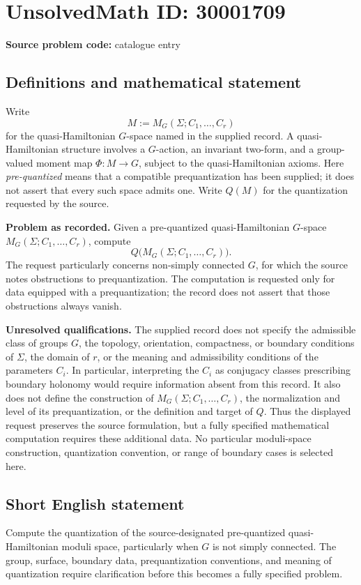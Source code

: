 \documentclass[11pt]{article}
\begin{document}
\section*{UnsolvedMath ID: 30001709}
\textbf{Source problem code:} catalogue entry
\subsection{Definitions and mathematical statement}
Write
\[
M:=M_G(\Sigma;C_1,\ldots,C_r)
\]
for the quasi-Hamiltonian \(G\)-space named in the supplied record. A quasi-Hamiltonian structure involves a \(G\)-action, an invariant two-form, and a group-valued moment map \(\Phi:M\to G\), subject to the quasi-Hamiltonian axioms. Here \emph{pre-quantized} means that a compatible prequantization has been supplied; it does not assert that every such space admits one. Write \(Q(M)\) for the quantization requested by the source.

\textbf{Problem as recorded.} Given a pre-quantized quasi-Hamiltonian \(G\)-space \(M_G(\Sigma;C_1,\ldots,C_r)\), compute
\[
Q\bigl(M_G(\Sigma;C_1,\ldots,C_r)\bigr).
\]
The request particularly concerns non-simply connected \(G\), for which the source notes obstructions to prequantization. The computation is requested only for data equipped with a prequantization; the record does not assert that those obstructions always vanish.

\textbf{Unresolved qualifications.} The supplied record does not specify the admissible class of groups \(G\), the topology, orientation, compactness, or boundary conditions of \(\Sigma\), the domain of \(r\), or the meaning and admissibility conditions of the parameters \(C_i\). In particular, interpreting the \(C_i\) as conjugacy classes prescribing boundary holonomy would require information absent from this record. It also does not define the construction of \(M_G(\Sigma;C_1,\ldots,C_r)\), the normalization and level of its prequantization, or the definition and target of \(Q\). Thus the displayed request preserves the source formulation, but a fully specified mathematical computation requires these additional data. No particular moduli-space construction, quantization convention, or range of boundary cases is selected here.
\subsection{Short English statement}
Compute the quantization of the source-designated pre-quantized quasi-Hamiltonian moduli space, particularly when \(G\) is not simply connected. The group, surface, boundary data, prequantization conventions, and meaning of quantization require clarification before this becomes a fully specified problem.
\end{document}
